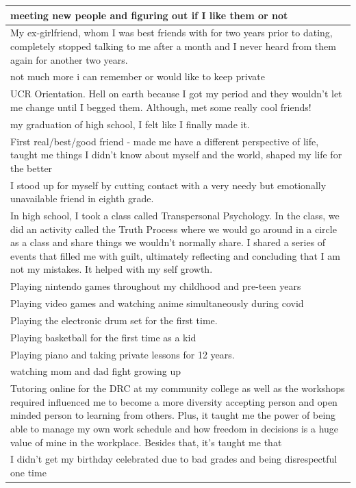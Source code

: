 \documentclass[
  .7em,
  letterpaper,
  DIV=11,
  numbers=noendperiod]{scrartcl}
\begin{document}
\begin{table}
\begin{tabular}{l}
\hline
meeting new people and figuring out if I like them or not\\
\hline
My ex-girlfriend, whom I was best friends with for two years prior to dating, completely stopped talking to me after a month and I never heard from them again for another two years.\\
\hline
not much more i can remember or would like to keep private\\
\hline
UCR Orientation. Hell on earth because I got my period and they wouldn't let me change until I begged them. Although, met some really cool friends!\\
\hline
my graduation of high school, I felt like I finally made it.\\
\hline
First real/best/good friend - made me have a different perspective of life, taught me things I didn't know about myself and the world, shaped my life for the better\\
\hline
I stood up for myself by cutting contact with a very needy but emotionally unavailable friend in eighth grade.\\
\hline
In high school, I took a class called Transpersonal Psychology. In the class, we did an activity called the Truth Process where we would go around in a circle as a class and share things we wouldn’t normally share. I shared a series of events that filled me with guilt, ultimately reflecting and concluding that I am not my mistakes. It helped with my self growth.\\
\hline
Playing nintendo games throughout my childhood and pre-teen years\\
\hline
Playing video games and watching anime simultaneously during covid\\
\hline
Playing the electronic drum set for the first time.\\
\hline
Playing basketball for the first time as a kid\\
\hline
Playing piano and taking private lessons for 12 years.\\
\hline
watching mom and dad fight growing up\\
\hline
Tutoring online for the DRC at my community college as well as the workshops required influenced me to become a more diversity accepting person and open minded person to learning from others. Plus, it taught me the power of being able to manage my own work schedule and how freedom in decisions is a huge value of mine in the workplace. Besides that, it's taught me that\\
\hline
I didn't get my birthday celebrated due to bad grades and being disrespectful one time\\

\end{tabular}
\end{table}
\end{document}
